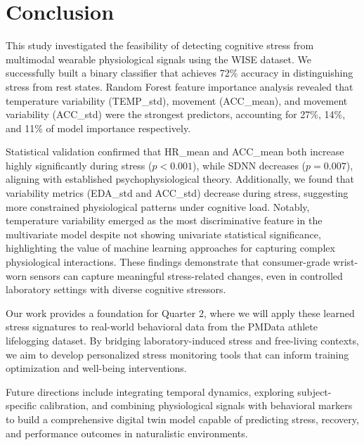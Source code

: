 \documentclass[12pt,letterpaper]{article}
\begin{document}

\section{Conclusion}

This study investigated the feasibility of detecting cognitive stress from multimodal wearable physiological signals using the WISE dataset. We successfully built a binary classifier that achieves 72\% accuracy in distinguishing stress from rest states. Random Forest feature importance analysis revealed that temperature variability (TEMP\_std), movement (ACC\_mean), and movement variability (ACC\_std) were the strongest predictors, accounting for 27\%, 14\%, and 11\% of model importance respectively.

Statistical validation confirmed that HR\_mean and ACC\_mean both increase highly significantly during stress ($p < 0.001$), while SDNN decreases ($p = 0.007$), aligning with established psychophysiological theory. Additionally, we found that variability metrics (EDA\_std and ACC\_std) decrease during stress, suggesting more constrained physiological patterns under cognitive load. Notably, temperature variability emerged as the most discriminative feature in the multivariate model despite not showing univariate statistical significance, highlighting the value of machine learning approaches for capturing complex physiological interactions. These findings demonstrate that consumer-grade wrist-worn sensors can capture meaningful stress-related changes, even in controlled laboratory settings with diverse cognitive stressors.

Our work provides a foundation for Quarter 2, where we will apply these learned stress signatures to real-world behavioral data from the PMData athlete lifelogging dataset. By bridging laboratory-induced stress and free-living contexts, we aim to develop personalized stress monitoring tools that can inform training optimization and well-being interventions.

Future directions include integrating temporal dynamics, exploring subject-specific calibration, and combining physiological signals with behavioral markers to build a comprehensive digital twin model capable of predicting stress, recovery, and performance outcomes in naturalistic environments.
\end{document}
